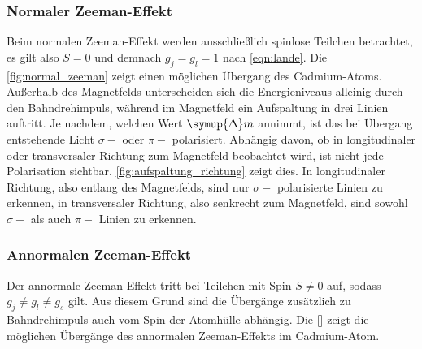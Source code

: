 \subsubsection{Normaler Zeeman-Effekt}

    Beim normalen Zeeman-Effekt werden ausschließlich spinlose Teilchen betrachtet,
    es gilt also $S = 0$ und demnach $g_j = g_l = 1$ nach \autoref{eqn:lande}.
    Die \autoref{fig:normal_zeeman} zeigt einen möglichen Übergang des Cadmium-Atoms.
    Außerhalb des Magnetfelds unterscheiden sich die Energieniveaus alleinig durch den Bahndrehimpuls,
    während im Magnetfeld ein Aufspaltung in drei Linien auftritt.
    Je nachdem,
    welchen Wert $\symup{\Delta} m$ annimmt,
    ist das bei Übergang entstehende Licht $\sigma-$ oder $\pi-$ polarisiert.
    Abhängig davon,
    ob in longitudinaler oder transversaler Richtung zum Magnetfeld beobachtet wird,
    ist nicht jede Polarisation sichtbar.
    \autoref{fig:aufspaltung_richtung} zeigt dies.
    In longitudinaler Richtung,
    also entlang des Magnetfelds,
    sind nur $\sigma-$ polarisierte Linien zu erkennen,
    in transversaler Richtung,
    also senkrecht zum Magnetfeld,
    sind sowohl $\sigma-$ als auch $\pi-$ Linien zu erkennen.

\subsubsection{Annormalen Zeeman-Effekt}

    Der annormale Zeeman-Effekt tritt bei Teilchen mit Spin $S \neq 0$ auf,
    sodass $g_j \neq g_l \neq g_s$ gilt.
    Aus diesem Grund sind die Übergänge zusätzlich zu Bahndrehimpuls auch vom Spin der Atomhülle abhängig.
    Die \autoref{} zeigt die möglichen Übergänge des annormalen Zeeman-Effekts im Cadmium-Atom.

